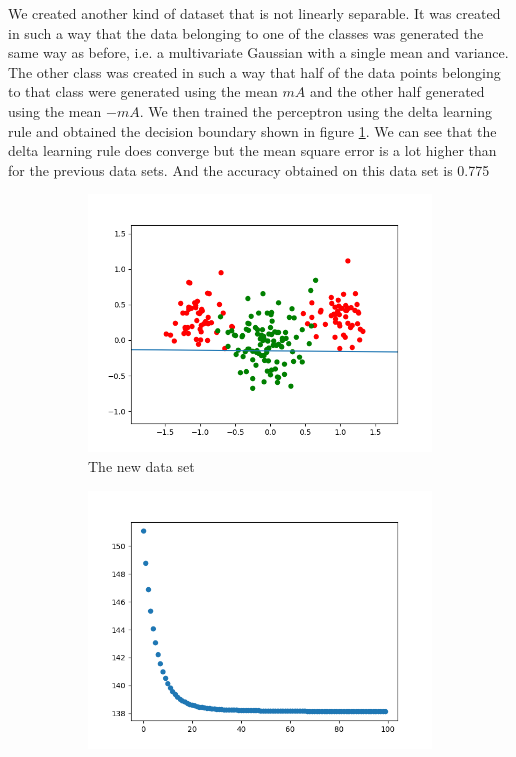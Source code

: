 \documentclass[a4paper]{article}
\begin{document}
We created another kind of dataset that is not linearly separable. It was created in such a way that the data belonging to one of the classes was generated the same way as before, i.e. a multivariate Gaussian with a single mean and variance. The other class was created in such a way that half of the data points belonging to that class were generated using the mean $mA$ and the other half generated using the mean $-mA$. We then trained the perceptron using the delta learning rule and obtained the decision boundary shown in figure \ref{fig:new-dataset}. We can see that the delta learning rule does converge but the mean square error is a lot higher than for the previous data sets. And the accuracy obtained on this data set is 0.775
\begin{figure}[htb]
    \centering
    \begin{subfigure}{0.4\textwidth}
        \includegraphics[width=\textwidth]{Labs/Lab 1/Lab 1a/Results/new-data.png}
        \caption{The new data set}
        \label{fig:new-dataset}
    \end{subfigure}
    \hfill
    \begin{subfigure}{0.4\textwidth}
        \includegraphics[width=\textwidth]{Labs/Lab 1/Lab 1a/Results/new-data-convergance.png}

\end{subfigure}
\end{figure}
\end{document}
